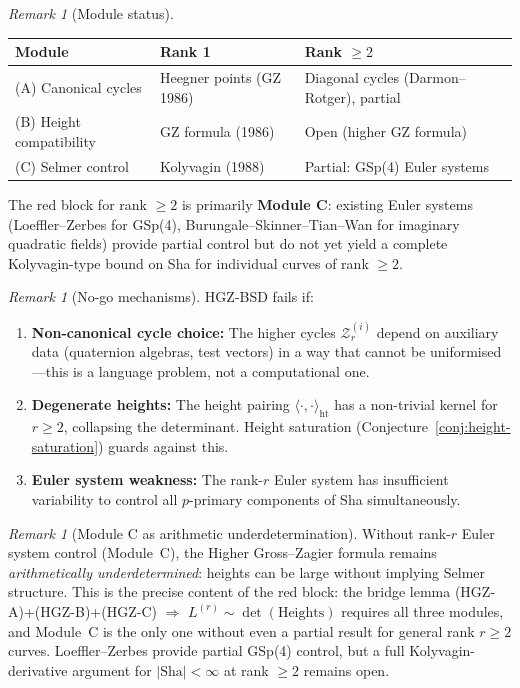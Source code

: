 \documentclass[aps,prd,twocolumn,superscriptaddress,nofootinbib]{revtex4-2}
\theoremstyle{definition}
\theoremstyle{remark}
\newtheorem{remark}[theorem]{Remark}
\begin{document}
\begin{remark}[Module status]\label{rem:hgz-modules}
\begin{center}
\begin{tabular}{|l|l|l|}
\hline
\textbf{Module} & \textbf{Rank 1} & \textbf{Rank $\geq 2$} \\
\hline
(A) Canonical cycles & Heegner points (GZ 1986) & Diagonal cycles (Darmon--Rotger), partial \\
(B) Height compatibility & GZ formula (1986) & Open (higher GZ formula) \\
(C) Selmer control & Kolyvagin (1988) & Partial: GSp(4) Euler systems \cite{LoefflerZerbes2024} \\
\hline
\end{tabular}
\end{center}
The red block for rank $\geq 2$ is primarily \textbf{Module C}: existing Euler systems (Loeffler--Zerbes for GSp(4), Burungale--Skinner--Tian--Wan \cite{BSTW2024} for imaginary quadratic fields) provide partial control but do not yet yield a complete Kolyvagin-type bound on Sha for individual curves of rank $\geq 2$.
\end{remark}

\begin{remark}[No-go mechanisms]\label{rem:hgz-nogo}
HGZ-BSD fails if:
\begin{enumerate}
\item \textbf{Non-canonical cycle choice:} The higher cycles $\mathcal{Z}_r^{(i)}$ depend on auxiliary data (quaternion algebras, test vectors) in a way that cannot be uniformised---this is a language problem, not a computational one.
\item \textbf{Degenerate heights:} The height pairing $\langle \cdot, \cdot \rangle_{\mathrm{ht}}$ has a non-trivial kernel for $r \geq 2$, collapsing the determinant. Height saturation (Conjecture~\ref{conj:height-saturation}) guards against this.
\item \textbf{Euler system weakness:} The rank-$r$ Euler system has insufficient variability to control all $p$-primary components of Sha simultaneously.
\end{enumerate}
\end{remark}

\begin{remark}[Module C as arithmetic underdetermination]\label{rem:module-c-underdetermined}
Without rank-$r$ Euler system control (Module~C), the Higher Gross--Zagier formula remains \emph{arithmetically underdetermined}: heights can be large without implying Selmer structure. This is the precise content of the red block: the bridge lemma (HGZ-A)+(HGZ-B)+(HGZ-C) $\Rightarrow$ $L^{(r)} \sim \det(\text{Heights})$ requires all three modules, and Module~C is the only one without even a partial result for general rank $r \geq 2$ curves. Loeffler--Zerbes \cite{LoefflerZerbes2024} provide partial GSp(4) control, but a full Kolyvagin-derivative argument for $|\mathrm{Sha}| < \infty$ at rank $\geq 2$ remains open.
\end{remark}
\end{document}
